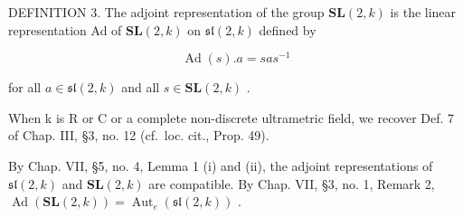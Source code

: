 DEFINITION 3. The adjoint representation of the group \(\mathbf{SL}(2,k)\) is the linear representation Ad of \(\mathbf{SL}(2,k)\) on \(\mathfrak{sl}(2,k)\) defined by

\[
\operatorname{Ad} (s). a = s a s ^ {- 1}
\]

for all \(a \in \mathfrak{sl}(2, k)\) and all \(s \in \mathbf{SL}(2, k)\) .

When k is R or C or a complete non-discrete ultrametric field, we recover Def. 7 of Chap. III, §3, no. 12 (cf.~loc. cit., Prop. 49).

By Chap. VII, §5, no. 4, Lemma 1 (i) and (ii), the adjoint representations of \(\mathfrak{sl}(2,k)\) and \(\mathbf{SL}(2,k)\) are compatible. By Chap. VII, §3, no. 1, Remark 2, \(\operatorname{Ad}(\mathbf{SL}(2,k)) = \operatorname{Aut}_e(\mathfrak{sl}(2,k))\) .


